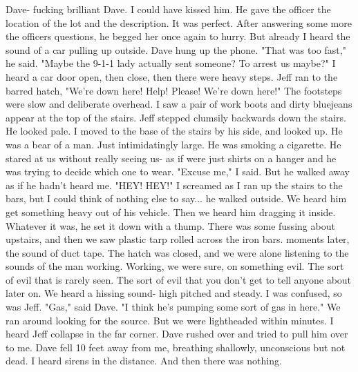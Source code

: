 \documentclass[a4paper]{article}
\begin{document}
Dave- fucking brilliant Dave. I could have kissed him. He gave the officer the location of the lot and the description. It was perfect. After answering some more the officers questions, he begged her once again to hurry. But already I heard the sound of a car pulling up outside.
Dave hung up the phone. "That was too fast," he said.
"Maybe the 9-1-1 lady actually sent someone? To arrest us maybe?"
I heard a car door open, then close, then there were heavy steps. Jeff ran to the barred hatch, "We're down here! Help! Please! We're down here!"
The footsteps were slow and deliberate overhead. I saw a pair of work boots and dirty bluejeans appear at the top of the stairs.
Jeff stepped clumsily backwards down the stairs. He looked pale. I moved to the base of the stairs by his side, and looked up.
He was a bear of a man. Just intimidatingly large. He was smoking a cigarette. He stared at us without really seeing us- as if were just shirts on a hanger and he was trying to decide which one to wear.
"Excuse me," I said. But he walked away as if he hadn't heard me.
"HEY! HEY!" I screamed as I ran up the stairs to the bars, but I could think of nothing else to say... he walked outside.
We heard him get something heavy out of his vehicle. Then we heard him dragging it inside. Whatever it was, he set it down with a thump.
There was some fussing about upstairs, and then we saw plastic tarp rolled across the iron bars. moments later, the sound of duct tape.
The hatch was closed, and we were alone listening to the sounds of the man working. Working, we were sure, on something evil. The sort of evil that is rarely seen. The sort of evil that you don't get to tell anyone about later on.
We heard a hissing sound- high pitched and steady.
I was confused, so was Jeff.
"Gas," said Dave. "I think he's pumping some sort of gas in here."
We ran around looking for the source. But we were lightheaded within minutes.
I heard Jeff collapse in the far corner. Dave rushed over and tried to pull him over to me.
Dave fell 10 feet away from me, breathing shallowly, unconscious but not dead.
I heard sirens in the distance. And then there was nothing.
\end{document}
